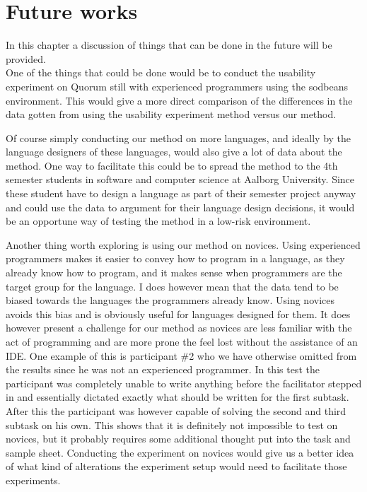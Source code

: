 \chapter{Future works}
\label{chap:further_works}
In this chapter a discussion of things that can be done in the future will be provided.
\\
One of the things that could be done would be to conduct the usability experiment on Quorum still with experienced programmers using the sodbeans environment.
This would give a more direct comparison of the differences in the data gotten from using the usability experiment method versus our method.

Of course simply conducting our method on more languages, and ideally by the language designers of these languages, would also give a lot of data about the method.
One way to facilitate this could be to spread the method to the 4th semester students in software and computer science at Aalborg University.
Since these student have to design a language as part of their semester project anyway and could use the data to argument for their language design decisions, it would be an opportune way of testing the method in a low-risk environment.

Another thing worth exploring is using our method on novices.
Using experienced programmers makes it easier to convey how to program in a language, as they already know how to program, and it  makes sense when programmers are the target group for the language.
I does however mean that the data tend to be biased towards the languages the programmers already know.
Using novices avoids this bias and is obviously useful for languages designed for them.
It does however present a challenge for our method as novices are less familiar with the act of programming and are more prone the feel lost without the assistance of an IDE.
One example of this is participant \#2 who we have otherwise omitted from the results since he was not an experienced programmer.
In this test the participant was completely unable to write anything before the facilitator stepped in and essentially dictated exactly what should be written for the first subtask.
After this the participant was however capable of solving the second and third subtask on his own.
This shows that it is definitely not impossible to test on novices, but it probably requires some additional thought put into the task and sample sheet.
Conducting the experiment on novices would give us a better idea of what kind of alterations the experiment setup would need to facilitate those experiments.

